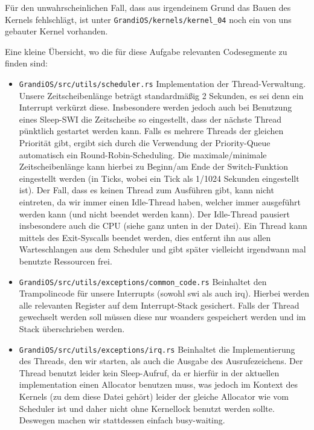 \begin{description}
Für den unwahrscheinlichen Fall, dass aus irgendeinem Grund das Bauen des Kernels fehlschlägt, ist unter {\texttt{GrandiOS/kernels/kernel\_04}} noch ein von uns gebauter Kernel vorhanden.

Eine kleine Übersicht, wo die für diese Aufgabe relevanten Codesegmente zu finden sind:
\begin{itemize}
	\item \texttt{GrandiOS/src/utils/scheduler.rs} Implementation der Thread-Verwaltung. Unsere Zeitscheibenlänge beträgt standardmäßig 2 Sekunden, es sei denn ein Interrupt verkürzt diese. Insbesondere werden jedoch auch bei Benutzung eines Sleep-SWI die Zeitscheibe so eingestellt, dass der nächste Thread pünktlich gestartet werden kann. Falls es mehrere Threads der gleichen Priorität gibt, ergibt sich durch die Verwendung der Priority-Queue automatisch ein Round-Robin-Scheduling. Die maximale/minimale Zeitscheibenlänge kann hierbei zu Beginn/am Ende der Switch-Funktion eingestellt werden (in Ticks, wobei ein Tick als 1/1024 Sekunden eingestellt ist). Der Fall, dass es keinen Thread zum Ausführen gibt, kann nicht eintreten, da wir immer einen Idle-Thread haben, welcher immer ausgeführt werden kann (und nicht beendet werden kann). Der Idle-Thread pausiert insbesondere auch die CPU (siehe ganz unten in der Datei). Ein Thread kann mittels des Exit-Syscalls beendet werden, dies entfernt ihn aus allen Warteschlangen aus dem Scheduler und gibt später vielleicht irgendwann mal benutzte Ressourcen frei.
	\item \texttt{GrandiOS/src/utils/exceptions/common\_code.rs} Beinhaltet den Trampolincode für unsere Interrupts (sowohl swi als auch irq). Hierbei werden alle relevanten Register auf dem Interrupt-Stack gesichert. Falls der Thread gewechselt werden soll müssen diese nur woanders gespeichert werden und im Stack überschrieben werden.
	\item \texttt{GrandiOS/src/utils/exceptions/irq.rs} Beinhaltet die Implementierung des Threads, den wir starten, als auch die Ausgabe des Ausrufezeichens. Der Thread benutzt leider kein Sleep-Aufruf, da er hierfür in der aktuellen implementation einen Allocator benutzen muss, was jedoch im Kontext des Kernels (zu dem diese Datei gehört) leider der gleiche Allocator wie vom Scheduler ist und daher nicht ohne Kernellock benutzt werden sollte. Deswegen machen wir stattdessen einfach busy-waiting.
\end{itemize}

\end{description}

